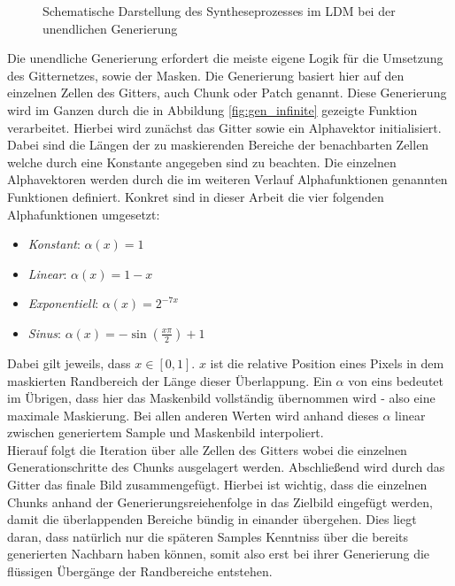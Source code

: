 \begin{figure}[htbp]
    \centering
    \caption{Schematische Darstellung des Syntheseprozesses im \ac{LDM} bei der unendlichen Generierung}
    \label{fig:infinite}
\end{figure}
Die unendliche Generierung erfordert die meiste eigene Logik für die Umsetzung des Gitternetzes, sowie der Masken. Die Generierung basiert hier auf den einzelnen Zellen des Gitters, auch Chunk oder Patch genannt. Diese Generierung wird im Ganzen durch die in Abbildung \ref{fig:gen_infinite} gezeigte Funktion verarbeitet. Hierbei wird zunächst das Gitter sowie ein Alphavektor initialisiert. Dabei sind die Längen der zu maskierenden Bereiche der benachbarten Zellen welche durch eine Konstante angegeben sind zu beachten. Die einzelnen Alphavektoren werden durch die im weiteren Verlauf Alphafunktionen genannten Funktionen definiert. Konkret sind in dieser Arbeit die vier folgenden Alphafunktionen umgesetzt: 
\begin{itemize}
    \item \textit{Konstant}: $\alpha(x) = 1$
    \item \textit{Linear}: $\alpha(x) = 1 - x$
    \item \textit{Exponentiell}: $\alpha(x) = 2^{-7x}$
    \item \textit{Sinus}: $\alpha(x) = -\sin(\frac{x\pi}{2}) + 1$
\end{itemize}
Dabei gilt jeweils, dass $x \in [0,1]$. $x$ ist die relative Position eines Pixels in dem maskierten Randbereich der Länge dieser Überlappung. Ein $\alpha$ von eins bedeutet im Übrigen, dass hier das Maskenbild vollständig übernommen wird - also eine maximale Maskierung. Bei allen anderen Werten wird anhand dieses $\alpha$ linear zwischen generiertem Sample und Maskenbild interpoliert. \\
Hierauf folgt die Iteration über alle Zellen des Gitters wobei die einzelnen Generationschritte des Chunks ausgelagert werden. Abschließend wird durch das Gitter das finale Bild zusammengefügt. Hierbei ist wichtig, dass die einzelnen Chunks anhand der Generierungsreiehenfolge in das Zielbild eingefügt werden, damit die überlappenden Bereiche bündig in einander übergehen. Dies liegt daran, dass natürlich nur die späteren Samples Kenntniss über die bereits generierten Nachbarn haben können, somit also erst bei ihrer Generierung die flüssigen Übergänge der Randbereiche entstehen. 
